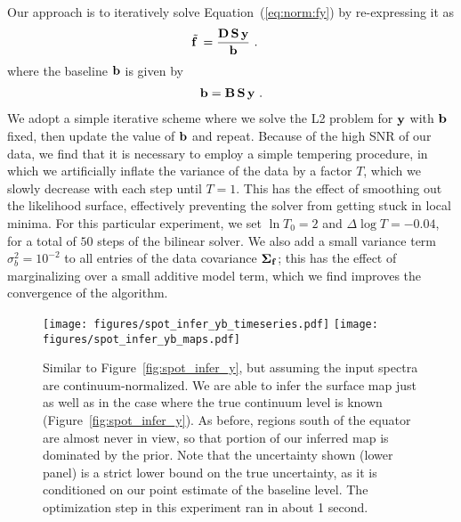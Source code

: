 \documentclass[modern]{aastex631}
\def\timeInferYB{about 1 second\xspace}
\begin{document}
Our approach is to iteratively solve Equation~(\ref{eq:norm:fy}) by re-expressing it as
%
\begin{align}
    \tilde{{\mathbf{f}}\hspace{0.2em}}
     & =
    \frac{
        {\mathbf{D}}
        \,
        {\mathbf{S}}
        \,
        {\mathbf{y}}
    }{
        {\mathbf{b}}
    }
    \hskip 0.33em.
\end{align}
%
where the baseline ${\mathbf{b}}$ is given by
%
\begin{align}
    {\ensuremath{\mathbf{b}}}
    =
    {\mathbf{B}}
    \,
    {\mathbf{S}}
    \,
    {\mathbf{y}}
    \hskip 0.33em.
\end{align}
%
We adopt a simple iterative scheme where we solve the L2 problem for ${\mathbf{y}}$ with ${\mathbf{b}}$ fixed, then update the value of ${\mathbf{b}}$ and repeat.
Because of the high SNR of our data, we find that it is necessary to employ a simple tempering procedure, in which we artificially inflate the variance of the data by a factor $T$, which we slowly decrease with each step until $T = 1$. 
This has the effect of smoothing out the likelihood surface, effectively preventing the solver from getting stuck in local minima.
For this particular experiment, we set $\ln T_0 = 2$ and $\Delta \log T = -0.04$, for a total of $50$ steps of the bilinear solver.
We also add a small variance term $\sigma_b^2 = 10^{-2}$ to all entries of the data covariance $\boldsymbol{\Sigma}_{{\mathbf{f}}}$; this has the effect of marginalizing over a small additive model term, which we find improves the convergence of the algorithm.

\begin{figure}[p!]
    \begin{centering}
        \texttt{[image: figures/spot\_infer\_yb\_timeseries.pdf]}
        \texttt{[image: figures/spot\_infer\_yb\_maps.pdf]}
        \caption{%
            Similar to Figure~\ref{fig:spot_infer_y}, but assuming the input spectra are continuum-normalized.
            We are able to infer the surface map just as well as in the case where the true continuum level is known (Figure~\ref{fig:spot_infer_y}). 
            As before, regions south of the equator are almost never in view, so that portion of our inferred map is dominated by the prior.
            Note that the uncertainty shown (lower panel) is a strict lower bound on the true uncertainty, as it is conditioned on our point estimate of the baseline level.
            The optimization step in this experiment ran in \timeInferYB.
        }
        \label{fig:spot_infer_yb}
    \end{centering}
\end{figure}
\end{document}
